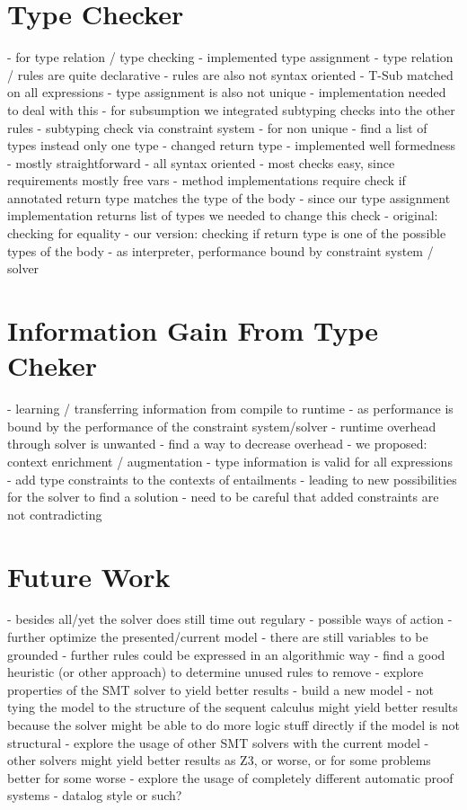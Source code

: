 \section{Type Checker}
- for type relation / type checking
  - implemented type assignment
    - type relation / rules are quite declarative
    - rules are also not syntax oriented
      - T-Sub matched on all expressions
    - type assignment is also not unique
  - implementation needed to deal with this
    - for subsumption we integrated subtyping checks into the other rules
      - subtyping check via constraint system
    - for non unique
      - find a list of types instead only one type
      - changed return type
  - implemented well formedness
    - mostly straightforward
    - all syntax oriented
    - most checks easy, since requirements mostly free vars
    - method implementations require check if annotated return type matches the type of the body
      - since our type assignment implementation returns list of types
        we needed to change this check
      - original: checking for equality
      - our version: checking if return type is one of the possible types of the body
  - as interpreter, performance bound by constraint system / solver

\section{Information Gain From Type Cheker}
- learning / transferring information from compile to runtime
  - as performance is bound by the performance of the constraint system/solver
  - runtime overhead through solver is unwanted
  - find a way to decrease overhead
  - we proposed: context enrichment / augmentation
  - type information is valid for all expressions
  - add type constraints to the contexts of entailments
  - leading to new possibilities for the solver to find a solution
  - need to be careful that added constraints are not contradicting

\section{Future Work}
  - besides all/yet the solver does still time out regulary
  - possible ways of action
    - further optimize the presented/current model
      - there are still variables to be grounded
      - further rules could be expressed in an algorithmic way
      - find a good heuristic (or other approach) to determine unused rules to remove
      - explore properties of the SMT solver to yield better results
    - build a new model
      - not tying the model to the structure of the sequent calculus might yield better results
        because the solver might be able to do more logic stuff directly if the model is not structural
    - explore the usage of other SMT solvers with the current model
      - other solvers might yield better results as Z3,
        or worse, or for some problems better for some worse
    - explore the usage of completely different automatic proof systems
      - datalog style or such?


